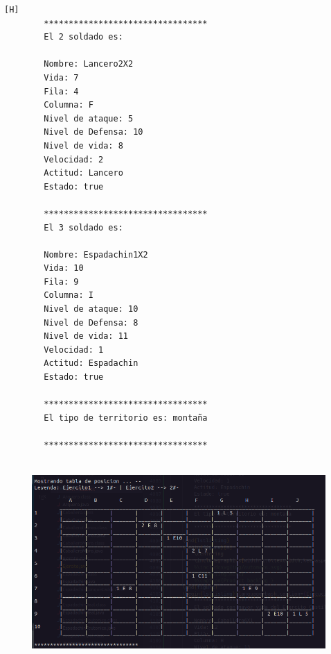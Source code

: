 \documentclass{article}
\begin{document}
\begin{lstlisting}[language=bash,caption={Ejecucion:}][H]
		*********************************
		El 2 soldado es: 
		
		Nombre: Lancero2X2
		Vida: 7
		Fila: 4
		Columna: F
		Nivel de ataque: 5
		Nivel de Defensa: 10
		Nivel de vida: 8
		Velocidad: 2
		Actitud: Lancero
		Estado: true
		
		*********************************
		El 3 soldado es: 
		
		Nombre: Espadachin1X2
		Vida: 10
		Fila: 9
		Columna: I
		Nivel de ataque: 10
		Nivel de Defensa: 8
		Nivel de vida: 11
		Velocidad: 1
		Actitud: Espadachin
		Estado: true
		
		*********************************
		El tipo de territorio es: montaña
		
		*********************************
		
	\end{lstlisting}
	\begin{figure}[H]
		\centering
		\includegraphics[width=1.0\textwidth,keepaspectratio]{img/Commit12-5.png}
	\end{figure}
\end{document}
